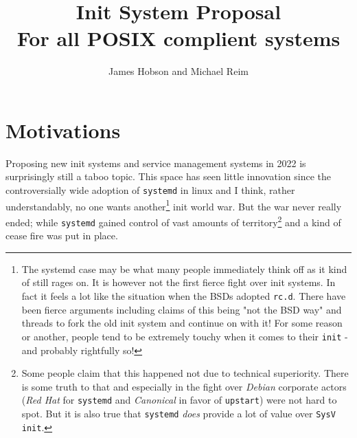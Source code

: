 \documentclass{article}
\title{Init System Proposal\\ \large{For all POSIX complient systems}}
\author{James Hobson and Michael Reim}
\begin{document}
\maketitle

\tableofcontents

\setlength{\parindent}{0em}
\setlength{\parskip}{1em}

\section{Motivations}
Proposing new init systems and service management systems in 2022 is surprisingly still a taboo topic.
This space has seen little innovation since the controversially wide adoption of \texttt{systemd} in
linux and I think, rather understandably, no one wants another\footnote{The systemd case may be what
many people immediately think off as it kind of still rages on. It is however not the first fierce
fight over init systems. In fact it feels a lot like the situation when the BSDs adopted \texttt{rc.d}.
There have been fierce arguments including claims of this being "not the BSD way" and threads to fork
the old init system and continue on with it! For some reason or another, people tend to be extremely
touchy when it comes to their \texttt{init} - and probably rightfully so!} init world war. But the war
never really ended; while \texttt{systemd} gained control of vast amounts of territory\footnote{Some
people claim that this happened not due to technical superiority. There is some truth to that and
especially in the fight over \textit{Debian} corporate actors (\textit{Red Hat} for \texttt{systemd}
and \textit{Canonical} in favor of \texttt{upstart}) were not hard to spot. But it is also true that
\texttt{systemd} \textit{does} provide a lot of value over \texttt{SysV init}.} and a kind of cease
fire was put in place.
\end{document}

